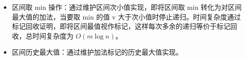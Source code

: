 \begin{itemize}
    \item 区间取 min 操作：通过维护区间次小值实现，即将区间取 min 转化为对区间最大值的加法，当要取 min 的值 v 大于次小值时停止递归。时间复杂度通过标记回收证明，即将区间最值视作标记，这样每次多余的递归等价于标记回收，总时间复杂度为 $O(m\log n)$。
    \item 区间历史最大值：通过维护加法标记的历史最大值实现。
\end{itemize}
\inputminted{cpp}{src/data structure/seg-beats.cpp}